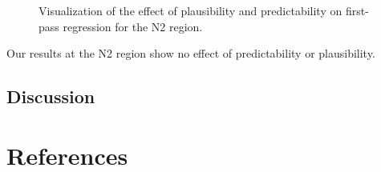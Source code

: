 \documentclass[
  letterpaper,
  DIV=11,
  numbers=noendperiod,
  nottoc,
  oneside]{scrreprt}
\begin{document}
\begin{figure}


\caption{\label{fig-firstpassn2}Visualization of the effect of
plausibility and predictability on first-pass regression for the N2
region.}

\end{figure}%

Our results at the N2 region show no effect of predictability or
plausibility.

\section{Discussion}\label{discussion}


\chapter*{References}\label{references}

\end{document}

